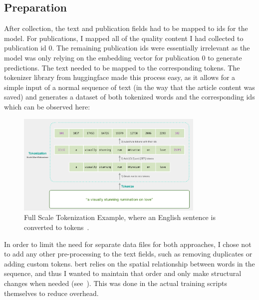 \subsection{Preparation}
After collection, the text and publication fields had to be mapped to ids for the model. For publications, I mapped all of the quality content I had collected to publication id 0. The remaining publication ids were essentially irrelevant as the model was only relying on the embedding vector for publication 0 to generate predictions. The text needed to be mapped to the corresponding tokens. The tokenizer library from huggingface made this process easy, as it allows for a simple input of a normal sequence of text (in the way that the article content was saved) and generates a dataset of both tokenized words and the corresponding ids which can be observed here:

\begin{figure}[H]
\centering
\includegraphics[width=0.8\textwidth]{fig/tokenization.png}
\caption{Full Scale Tokenization Example, where an English sentence is converted to tokens~\parencite{alammar_2019}.
}
\label{fig:tokenization}
\end{figure}

In order to limit the need for separate data files for both approaches, I chose not to add any other pre-processing to the text fields, such as removing duplicates or adding custom tokens. \acrshort{bert} relies on the spatial relationship between words in the sequence, and thus I wanted to maintain that order and only make structural changes when needed (see~). This was done in the actual training scripts themselves to reduce overhead. 